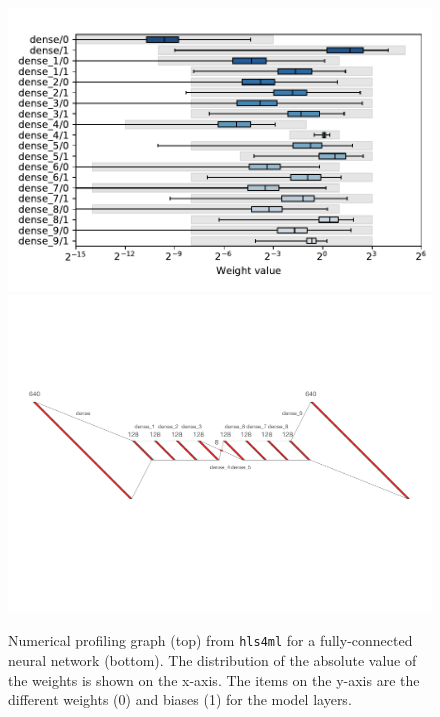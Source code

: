 \documentclass[tinyml]{acmart}
\newcommand{\hlsfml}{\texttt{hls4ml}\xspace}
\begin{document}
\begin{figure}[t!]
\centering
\includegraphics[width=0.9\columnwidth]{Figs/slider_weights.pdf}
\includegraphics[width=0.9\columnwidth]{Figs/nn_mlp.pdf}
\caption{Numerical profiling graph (top) from \hlsfml for a fully-connected neural network (bottom).
The distribution of the absolute value of the weights is shown on the x-axis.
The items on the y-axis are the different weights (0) and biases (1) for the model layers. }
\label{fig:profiling}
\end{figure}

\end{document}
